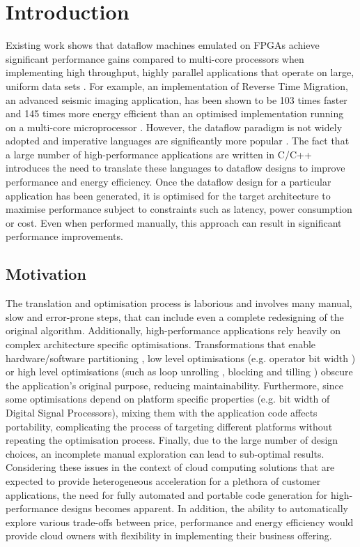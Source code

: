 \chapter{Introduction}
\renewcommand{\thepage}{\arabic{page}}

Existing work shows that dataflow machines emulated on FPGAs achieve
significant performance gains compared to multi-core processors when
implementing high throughput, highly parallel applications that
operate on large, uniform data sets \cite{Flynn:Pell:Mencer:2012,
  Mencer:2012}.  For example, an implementation of Reverse Time
Migration, an advanced seismic imaging application, has been shown to
be 103 times faster and 145 times more energy efficient than an
optimised implementation running on a multi-core microprocessor
\cite{Xinyu:Qiwei:Luk:Qiang:Pell:2012}. However, the dataflow paradigm
is not widely adopted and imperative languages are significantly more
popular \cite{Tiobe:2012}. The fact that a large number of
high-performance applications are written in C/C++ introduces the need
to translate these languages to dataflow designs to improve
performance and energy efficiency. Once the dataflow design for a
particular application has been generated, it is optimised for the
target architecture to maximise performance subject to constraints
such as latency, power consumption or cost. Even when performed
manually, this approach can result in significant performance
improvements.

\section{Motivation}

The translation and optimisation process is laborious and involves
many manual, slow and error-prone steps, that can include even a
complete redesigning of the original algorithm. Additionally,
high-performance applications rely heavily on complex architecture
specific optimisations. Transformations that enable hardware/software
partitioning \cite{Lam:Coutinho:Luk:2008}, low level optimisations
(e.g. operator bit width \cite{Cardoso:Diniz:Weinhardt:2010}) or high
level optimisations (such as loop unrolling \cite{aho1977principles},
blocking and tilling \cite{wolfe1995high}) obscure the application's
original purpose, reducing maintainability. Furthermore, since some
optimisations depend on platform specific properties (e.g. bit width
of Digital Signal Processors), mixing them with the application code
affects portability, complicating the process of targeting different
platforms without repeating the optimisation process. Finally, due to
the large number of design choices, an incomplete manual exploration
can lead to sub-optimal results. Considering these issues in the
context of cloud computing solutions that are expected to provide
heterogeneous acceleration for a plethora of customer applications,
the need for fully automated and portable code generation for
high-performance designs becomes apparent. In addition, the ability to
automatically explore various trade-offs between price, performance
and energy efficiency would provide cloud owners with flexibility in
implementing their business offering.

